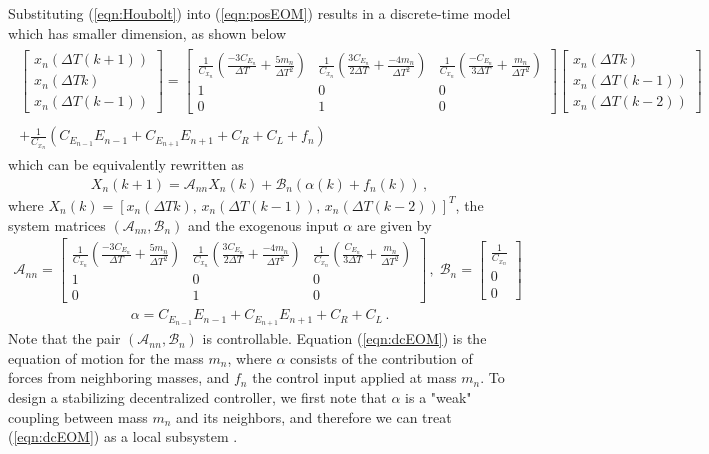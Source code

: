 \documentclass[11pt]{ucthesis}
\begin{document}
Substituting (\ref{eqn:Houbolt}) into (\ref{eqn:posEOM}) results in a discrete-time model which has smaller dimension, as shown below
\begin{eqnarray}
\begin{matrix}
\begin{bmatrix}x_n(\Delta T(k+1))\\x_n(\Delta Tk)\\x_n(\Delta T(k-1))\end{bmatrix} =
\begin{bmatrix}
\frac{1}{C_{x_n}}(\frac{-3C_{E_n}}{\Delta T}+\frac{5m_n}{\Delta T^2})&\frac{1}{C_{x_n}}(\frac{3C_{E_n}}{2\Delta T}+\frac{-4m_n}{\Delta T^2})&\frac{1}{C_{x_n}}(\frac{-C_{E_n}}{3\Delta T}+\frac{m_n}{\Delta T^2})\\1&0&0\\0&1&0
\end{bmatrix}
\begin{bmatrix}
x_n(\Delta Tk)\\x_n(\Delta T(k-1))\\x_n(\Delta T(k-2))
\end{bmatrix}
\\\\+ \frac{1}{C_{x_n}}( C_{E_{n-1}}E_{n-1}+C_{E_{n+1}}E_{n+1}+C_R+C_L+f_n)
\end{matrix}
\label{eqn:decent}
\end{eqnarray}
which can be equivalently rewritten as 
\begin{eqnarray}
X_n (k+1) = \mathcal{A}_{nn} X_n (k) + \mathcal{B}_n (\alpha (k) +f_n (k) ) \,,
\label{eqn:dcEOM}
\end{eqnarray}
where $X_n (k) = \left [ x_n(\Delta T k),\, x_n(\Delta T (k-1)),\,x_n(\Delta T(k-2)) \right ]^T$, the system matrices $(\mathcal{A}_{nn},\mathcal{B}_n)$ and the exogenous input $\alpha$ are given by
\begin{eqnarray}
\mathcal{A}_{nn} = \begin{bmatrix}
\frac{1}{C_{x_n}}(\frac{-3C_{E_n}}{\Delta T}+\frac{5m_n}{\Delta T^2})&\frac{1}{C_{x_n}}(\frac{3C_{E_n}}{2\Delta T}+\frac{-4m_n}{\Delta T^2})&\frac{1}{C_{x_n}}(\frac{C_{E_n}}{3\Delta T}+\frac{m_n}{\Delta T^2})\\1&0&0\\0&1&0
\end{bmatrix} \,,\;
\mathcal{B}_n = 
\begin{bmatrix}
\frac{1}{C_{x_n}}\\0\\0
\end{bmatrix}
\end{eqnarray}
\begin{eqnarray}
\alpha = C_{E_{n-1}}E_{n-1}+C_{E_{n+1}}E_{n+1}+C_R+C_L \,.
\end{eqnarray}
Note that the pair $(\mathcal{A}_{nn},\mathcal{B}_n)$ is controllable. Equation (\ref{eqn:dcEOM}) is the equation of motion for the mass $m_n$, where $\alpha$ consists of the contribution of forces from neighboring masses, and $f_n$ the control input applied at mass $m_n$. To design a stabilizing decentralized controller, we first note that $\alpha$ is a "weak" coupling between mass $m_n$ and its neighbors, and therefore we can treat (\ref{eqn:dcEOM}) as a local subsystem \cite{siljak1978large}. 
\end{document}
